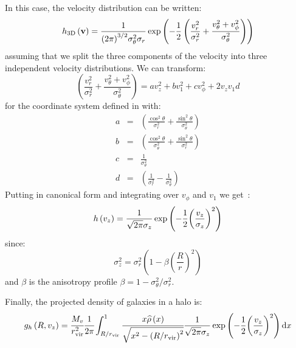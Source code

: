 In this case, the velocity distribution can be written:
\begin{equation}
    h_\mathrm{3D}\left(\textbf{v}\right)=
    \frac{1}{{\left({2\pi}\right)}^{3/2}\sigma_{\theta}^2\sigma_r}
    \exp\left(-\frac{1}{2}\left(\frac{v_r^2}{\sigma_r^2}+
    \frac{v_{\theta}^2+v_{\phi}^2}{\sigma_{\theta}^2}\right)\right)
\end{equation}
%
assuming that we split the three components of the velocity into three
independent velocity distributions. We can transform:
%
\begin{equation}
    \label{eq:poly}
    \left(\frac{v_r^2}{\sigma_r^2}+\frac{v_{\theta}^2+
    v_{\phi}^2}{\sigma_{\theta}^2}\right) =
    a v_z^2 + b v_1^2 + c v_\phi^2 + 2 v_z v_1 d
\end{equation}
%
for the coordinate system defined in  with:
%
\begin{eqnarray}
    a&=&\left(\frac{\cos^2\theta}{\sigma_r^2}+
        \frac{\sin^2\theta}{\sigma_\theta^2}\right)\nonumber\\
    b&=&\left(\frac{\cos^2\theta}{\sigma_\theta^2}+
        \frac{\sin^2\theta}{\sigma_r^2}\right)\nonumber\\
    c&=&\frac{1}{\sigma_\theta^2}\nonumber\\
    d&=&\left(\frac{1}{\sigma_r^2}-\frac{1}{\sigma_\theta^2}\right)
\end{eqnarray}
%
Putting  in canonical form and integrating
 over $v_\phi$ and $v_1$ we get~\cite{Mamon+13}:
%
\begin{equation}
    \label{eq:velocity_distribution}
    h\left(v_z\right) = \frac{1}{\sqrt{2\pi}\sigma_z}
    \exp\left(-\frac{1}{2}{\left(\frac{v_z}{\sigma_z}\right)}^2\right)
\end{equation}
%
since:
%
\begin{equation}
    \sigma_z^2 =
    \sigma_r^2\left(1-\beta{\left(\frac{R}{r}\right)}^2\right)
\end{equation}
%
and $\beta$ is the anisotropy profile $\beta=1-\sigma_\theta^2/\sigma_r^2$.

Finally, the projected density of galaxies in a halo is:
%
\begin{equation}
    g_h \left(R, v_z\right) =\cfrac{M_v}{r_{\rm vir}^2}
    \cfrac{1}{2\pi}
    \int_{R/r_{\rm vir}}^1
    \cfrac{x\widehat\rho \left(x\right)}{\sqrt{x^2 -
    {\left(R/r_{\rm vir}\right)}^2}}\frac{1}{\sqrt{2\pi}\sigma_z}
    \exp\left(-\frac{1}{2}{\left(\frac{v_z}{\sigma_z}\right)}^2\right){\rm{d}} x
\end{equation}


